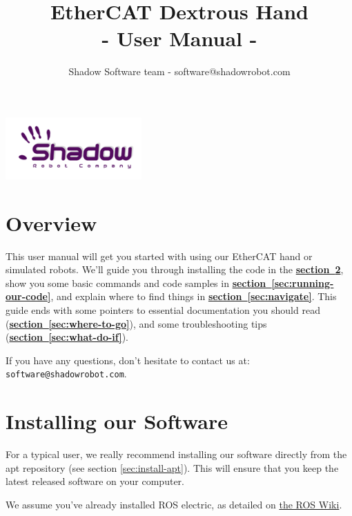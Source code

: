 \documentclass[12pt]{article}
\title{\textbf{EtherCAT Dextrous Hand} \\
- User Manual -}
\author{Shadow Software team - software@shadowrobot.com}
\newcommand{\link}[1]{\hyperref[sec:#1]{\textbf{section~\ref*{sec:#1}}}}
\begin{document}
\begin{titlepage}

\maketitle
\vspace{5cm}
\begin{center}
\includegraphics{images/logo-shadowDB.png}
\end{center}
\end{titlepage}

\tableofcontents
\newpage

\section{Overview}
\label{sec:overview}

\par This user manual will get you started with using our EtherCAT hand or simulated robots. We'll guide you through installing the code in the \link{install}, show you some basic commands and code samples in \link{running-our-code}, and explain where to find things in \link{navigate}. This guide ends with some pointers to essential documentation you should read (\link{where-to-go}), and some troubleshooting tips (\link{what-do-if}).

\par If you have any questions, don't hesitate to contact us at: \texttt{software@shadowrobot.com}.

\newpage

\section{Installing our Software}
\label{sec:install}
\par For a typical user, we really recommend installing our software directly from the apt repository (see section \ref{sec:install-apt}). This will ensure that you keep the latest released software on your computer.

\par We assume you've already installed ROS electric, as detailed on \href{http://www.ros.org/wiki/electric/Installation/Ubuntu}{the ROS Wiki}.
\end{document}
